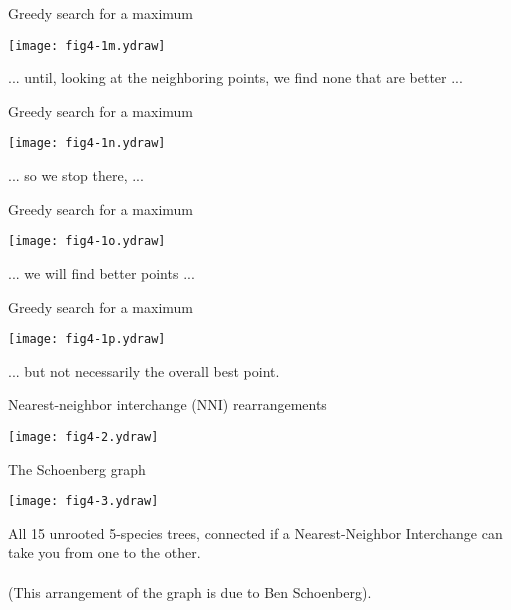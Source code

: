 \documentclass[bluish,slideColor,colorBG,pdf]{prosper}
\begin{document}
\begin{slide}[Replace]{Greedy search for a maximum}

\centerline{\texttt{[image: fig4-1m.ydraw]}}
\bigskip

... until, looking at the neighboring points, we find none that are better ...

\end{slide}

\begin{slide}[Replace]{Greedy search for a maximum}

\centerline{\texttt{[image: fig4-1n.ydraw]}}
\bigskip

... so we stop there, ...

\end{slide}

\begin{slide}[Replace]{Greedy search for a maximum}

\centerline{\texttt{[image: fig4-1o.ydraw]}}
\bigskip

... we will find better points ... 

\end{slide}

\begin{slide}[Replace]{Greedy search for a maximum}

\centerline{\texttt{[image: fig4-1p.ydraw]}}
\bigskip

... but not necessarily the overall best point.

\end{slide}

\begin{slide}[Replace]{Nearest-neighbor interchange (NNI)  rearrangements}

\centerline{\texttt{[image: fig4-2.ydraw]}}

\end{slide}

\begin{slide}[Replace]{The Schoenberg graph}

\hspace*{0in}\hspace{-0.1in}\texttt{[image: fig4-3.ydraw]} \hspace{-0.3in}
\parbox[b]{1.6in}{
\begin{flushleft}All 15 unrooted 5-species trees, connected if a Nearest-Neighbor
Interchange can take you from one to the other.\\
~\\
(This arrangement of the graph is due to Ben Schoenberg).
\end{flushleft}}

\end{slide}
\end{document}
